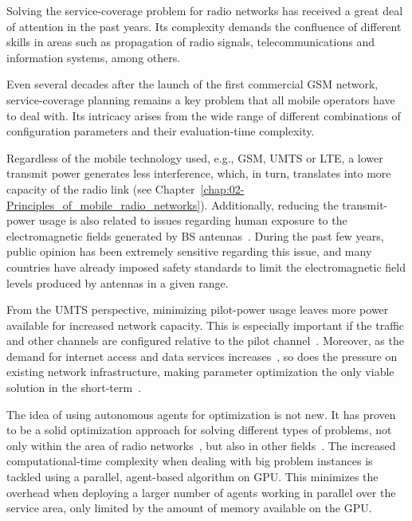 Solving the service-coverage problem for radio networks has received
a great deal of attention in the past years. Its complexity demands
the confluence of different skills in areas such as propagation of
radio signals, telecommunications and information systems, among others.

Even several decades after the launch of the first commercial GSM
network, service-coverage planning remains a key problem that all
mobile operators have to deal with. Its intricacy arises from the
wide range of different combinations of configuration parameters and
their evaluation-time complexity.

Regardless of the mobile technology used, e.g., GSM, UMTS or LTE,
a lower transmit power generates less interference, which, in turn,
translates into more capacity of the radio link (see Chapter~\ref{chap:02-Principles_of_mobile_radio_networks}).
Additionally, reducing the transmit-power usage is also related to
issues regarding human exposure to the electromagnetic fields generated
by BS antennas~\cite{Esposito_Genetic.optimization.for.optimum.3G.network.planning:2010}.
During the past few years, public opinion has been extremely sensitive
regarding this issue, and many countries have already imposed safety
standards to limit the electromagnetic field levels produced by antennas
in a given range.

From the UMTS perspective, minimizing pilot-power usage leaves more
power available for increased network capacity. This is especially
important if the traffic and other channels are configured relative
to the pilot channel~\cite{WCDMAforUMTS_RadioAccessForThirdGenerationMobileCommunications}.
Moreover, as the demand for internet access and data services increases~\cite{Cunningham_Network.growth.theory.and.evidence:2010},
so does the pressure on existing network infrastructure, making parameter
optimization the only viable solution in the short-term~\cite{Nawrocki-Understanding_UMTS_radio_network_modelling_and_optimisation:2006}.

\bigskip{}


The idea of using autonomous agents for optimization is not new. It
has proven to be a solid optimization approach for solving different
types of problems, not only within the area of radio networks~\cite{Cheung_Realtime.video.using.agent.over.3G.networks:2005,Esposito_Genetic.optimization.for.optimum.3G.network.planning:2010},
but also in other fields~\cite{Valcarce_Applying.FDTD.to.the.coverage.prediction.of.WiMAX:2009,Vasile_Hybrid.multiagent.approach.for.optimization:2009}.
The increased computational-time complexity when dealing with big
problem instances is tackled using a parallel, agent-based algorithm
on GPU. This minimizes the overhead when deploying a larger number
of agents working in parallel over the service area, only limited
by the amount of memory available on the GPU.



